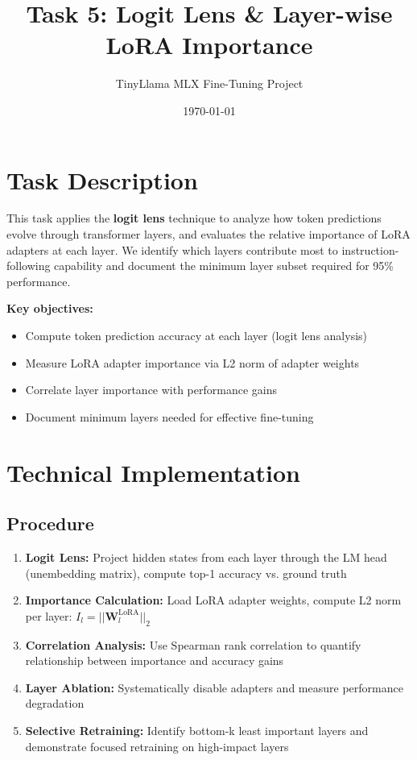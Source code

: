 \documentclass[11pt,a4paper]{article}
\title{\textbf{Task 5: Logit Lens \& Layer-wise LoRA Importance}}
\author{TinyLlama MLX Fine-Tuning Project}
\date{\today}
\begin{document}
\maketitle

\section*{Task Description}
This task applies the \textbf{logit lens} technique to analyze how token predictions evolve through transformer layers, and evaluates the relative importance of LoRA adapters at each layer. We identify which layers contribute most to instruction-following capability and document the minimum layer subset required for 95\% performance.

\textbf{Key objectives:}
\begin{itemize}
    \item Compute token prediction accuracy at each layer (logit lens analysis)
    \item Measure LoRA adapter importance via L2 norm of adapter weights
    \item Correlate layer importance with performance gains
    \item Document minimum layers needed for effective fine-tuning
\end{itemize}

\section*{Technical Implementation}

\subsection*{Procedure}
\begin{enumerate}
    \item \textbf{Logit Lens:} Project hidden states from each layer through the LM head (unembedding matrix), compute top-1 accuracy vs. ground truth
    \item \textbf{Importance Calculation:} Load LoRA adapter weights, compute L2 norm per layer: $I_l = ||\mathbf{W}_l^{\mathrm{LoRA}}||_2$
    \item \textbf{Correlation Analysis:} Use Spearman rank correlation to quantify relationship between importance and accuracy gains
    \item \textbf{Layer Ablation:} Systematically disable adapters and measure performance degradation
    \item \textbf{Selective Retraining:} Identify bottom-k least important layers and demonstrate focused retraining on high-impact layers
\end{enumerate}
\end{document}
